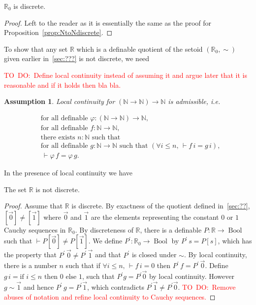 \documentclass[envcountsame]{llncs}
\newcommand{\todo}[1]{\textcolor{red}{TO~DO:~#1}}
\newtheorem{assumption}[theorem]{Assumption}
\newcommand{\N}{\mathbb{N}}
\newcommand{\R}{\mathbb{R}}
\providecommand{\class}[1]{[#1]}
\DeclareMathOperator{\Bool}{Bool}
\begin{document}
\begin{proposition}
 $\R_0$ is discrete.
\end{proposition}
\begin{proof}
Left to the reader as it is essentially the same as the proof for Proposition~\ref{prop:NtoNdiscrete}.
\end{proof}
To show that any set $\R$ which is a definable quotient of the setoid $(\R_0,\sim)$ given earlier in~\ref{sec:???} is not discrete, we need

\todo{Define local continuity instead of assuming it and argue later that it is reasonable and if it holds then bla bla.}
\begin{assumption}
Local continuity  for $(\N \to \N) \to \N$ is admissible, i.e.

\newcommand{\fad}{\text{for all definable }}
\begin{align*}
   &\fad \varphi : (\N \to \N) \to \N,\\
   &\fad f : \N \to \N,\\
   &\text{there exists }  n:\N\text{ such that }\\
   &\fad g : \N \to \N \text{ such that } (\forall i\leq n,\, \vdash f\,i = g\,i),\\
   &{\,\vdash \varphi\, f} = \varphi\, g.
\end{align*}
\end{assumption}

In the presence of local continuity we have 
\begin{proposition}\label{prop:Rnotdiscrete} The set $\R$ is not discrete.
\end{proposition}
\begin{proof}
Assume that $\R$ is discrete. By exactness of the quotient defined in~\ref{sec:??}, $\class{\vec 0} \neq \class{\vec 1}$ where $\vec 0$ and $\vec 1$ are the elements representing the constant $0$ or $1$ Cauchy sequences in $\R_0$. By discreteness of $\R$, there is a definable $P:\R\to\Bool$ 
such that $\vdash P\class{\vec 0}\neq P\class{\vec 1 }$. We define $P^\prime:\R_0\to\Bool$ by $P^\prime\,s = P\class{s}$, which has the property that $P^\prime\,\vec0\neq P^\prime\,\vec 1$ and that $P^\prime$ is closed under $\sim$. By local continuity, there is a number $n$  such that if $\forall i\leq n,\, \vdash f\,i = 0$ then $P^\prime \, f = P^\prime\,\vec 0$. Define $g\,i=\text{if } i\leq n \text{ then } 0 \text{ else } 1$, such that $P^\prime g =P^\prime \vec 0$ by local continuity. However $g \sim \vec 1$ and hence $P^\prime\,g=P^\prime \vec 1$, which contradicts $P^\prime \vec 1 \neq P^\prime \vec 0$. 
\todo{Remove abuses of notation and refine local continuity to Cauchy sequences.}
\end{proof}
\end{document}
